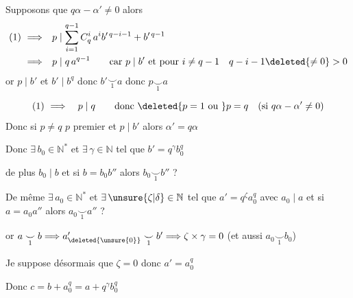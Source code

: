 Supposons que $q\alpha-\alpha'\ne0$ alors
\[
\begin{aligned}
(1)\ \Longrightarrow\quad &p\mid\sum_{i=1}^{q-1}C_q^i\,a^i b'^{\,q-i-1}+b'^{\,q-1}\\
\Longrightarrow\quad &p\mid q\,a^{q-1}\qquad\text{car }p\mid b'\ \text{et pour }i\ne q-1\quad q-i-1\deleted{\ne0}>0
\end{aligned}
\]
or $p\mid b'$ et $b'\mid b^q$ donc $b'\mathrel{\underset{1}{\smile}}a$ donc $p\mathrel{\underset{1}{\smile}}a$

\[
(1)\ \Longrightarrow\quad p\mid q\qquad\text{donc }\deleted{p=1\ \text{ou }}p=q\quad(\text{si }q\alpha-\alpha'\ne0)
\]
Donc si $p\ne q$ \quad $p$ premier  et $p\mid b'$ alors $\alpha'=q\alpha$ 

Donc $\exists\,b_0\in\mathbb N^*$ et $\exists\,\gamma\in\mathbb N$ tel que $b'=q^\gamma b_0^q$ 

de plus $b_0\mid b$ et si $b=b_0 b''$ alors $b_0\mathrel{\underset{1}{\smile}}b''$ ?

De même $\exists\,a_0\in\mathbb N^*$ et $\exists\,\unsure{\zeta|\delta}\in\mathbb N$ tel que $a'=q^\zeta a_0^q$ avec $a_0\mid a$ et si $a=a_0a''$ alors $a_0\mathrel{\underset{1}{\smile}}a''$ ?

or $a\mathrel{\underset{1}{\smile}}b\Longrightarrow a_{\deleted{\unsure{0}}}'\mathrel{\underset{1}{\smile}}b'\Longrightarrow\zeta\times\gamma=0$ (et aussi $a_0\mathrel{\underset{1}{\smile}}b_0$)

Je suppose désormais que $\zeta=0$ donc $a'=a_0^q$

Donc \quad $c=b+a_0^q=a+q^\gamma b_0^q$

